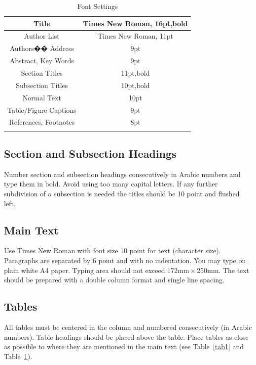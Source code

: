 \documentclass[english]{ccdconf}
\begin{document}
\begin{table}
  \centering
  \caption{Font Settings}
  \label{tab2}
  \begin{tabular}{c|c}
    \hhline
    Title           & Times New Roman, 16pt,bold \\ \hline
    Author List         & Times New Roman, 11pt \\ \hline
    Authors�� Address       & 9pt \\ \hline
    Abstract, Key Words     & 9pt \\ \hline
    Section Titles      & 11pt,bold \\ \hline
    Subsection Titles       & 10pt,bold \\ \hline
    Normal Text         & 10pt \\ \hline
    Table/Figure Captions   & 9pt \\ \hline
    References, Footnotes   & 8pt \\
    \hhline
  \end{tabular}
\end{table}

\subsection{Section and Subsection Headings}

Number section and subsection headings consecutively in Arabic numbers and
type them in bold. Avoid using too many capital letters. If any further
subdivision of a subsection is needed the titles should be 10 point and
flushed left.

\subsection{Main Text}

Use Times New Roman with font size 10 point for text (character
size). Paragraphs are separated by 6 point and with no indentation.
You may type on plain white A4 paper. Typing area should not exceed
172mm${}\times{}$250mm. The text should be prepared with a double
column format and single line spacing.

\subsection{Tables}

All tables must be centered in the column and numbered consecutively
(in Arabic numbers). Table headings should be placed above the table.
Place tables as close as possible to where they are mentioned in the
main text (see Table~\ref{tab1} and Table~\ref{tab2}).
\end{document}
